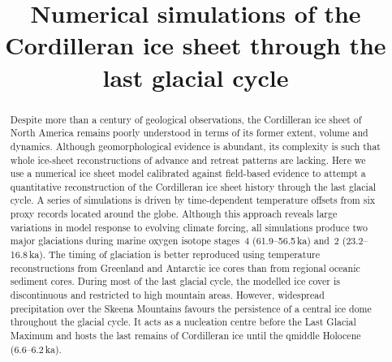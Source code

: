 \documentclass[tc, manuscript]{copernicus}
\begin{document}
\hack{\sloppy}


\title{Numerical simulations of the Cordilleran ice sheet
       through the last glacial cycle}






\hack{\allowdisplaybreaks}

\received{}
\pubdiscuss{}
\revised{}
\accepted{}
\published{}


\maketitle


\begin{abstract}
Despite more than a century of geological observations, the
Cordilleran ice sheet of North America remains poorly understood in
terms of its former extent, volume and dynamics. Although
geomorphological evidence is abundant, its complexity is such that
whole ice-sheet reconstructions of advance and retreat patterns are
lacking. Here we use a numerical ice sheet model calibrated against
field-based evidence to attempt a quantitative reconstruction of the
Cordilleran ice sheet history through the last glacial
cycle. A series of simulations is driven by time-dependent
temperature offsets from six proxy records located around the
globe. Although this approach reveals large variations in model
response to evolving climate forcing, all simulations produce two
major glaciations during marine oxygen isotope stages~4
(61.9--56.5\,\unit{ka}) and~2 (23.2--16.8\,\unit{ka}). The timing of
glaciation is better reproduced using temperature reconstructions
from Greenland and Antarctic ice cores than from regional oceanic
sediment cores. During most of the last glacial cycle, the modelled
ice cover is discontinuous and restricted to high mountain
areas. However, widespread precipitation over the Skeena Mountains
favours the persistence of a central ice dome throughout the glacial
cycle. It acts as a nucleation centre before the Last Glacial
Maximum and hosts the last remains of Cordilleran ice until the
qmiddle Holocene (6.6--6.2\,\unit{ka}).
\end{abstract}
\end{document}
